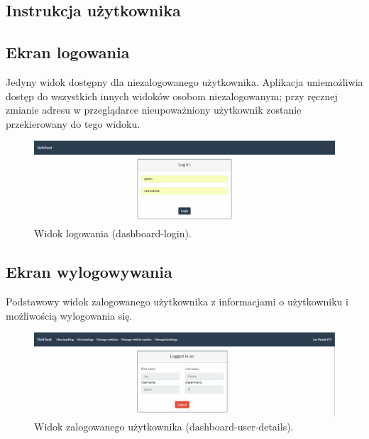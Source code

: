 \documentclass[eng,printmode,openany]{mgr}
\begin{document}
	
	
	\newpage 
	
	\begin{appendices}
		
		\chapter{Instrukcja użytkownika}
		\section{Ekran logowania}
		Jedyny widok dostępny dla niezalogowanego użytkownika. Aplikacja uniemożliwia dostęp do wszystkich innych widoków osobom niezalogowanym; przy ręcznej zmianie adresu w przeglądarce nieupoważniony użytkownik zostanie przekierowany do tego widoku.
		\begin{figure}[H]
			\centering
			\includegraphics[width=\textwidth]{images/views/dashboard-login.png}
			\caption{Widok logowania (dashboard-login).} 		
		\end{figure}
		
		\section{Ekran wylogowywania}
		Podstawowy widok zalogowanego użytkownika z informacjami o użytkowniku i możliwością wylogowania się.
		\begin{figure}[H]
			\centering			
			\includegraphics[width=\textwidth]{images/views/dashboard-logout.png}
			\caption{Widok zalogowanego użytkownika (dashboard-user-details).} 
		\end{figure}
		

\end{appendices}
\end{document}
